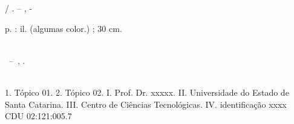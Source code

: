 \imprimircapa

\imprimirfolhaderosto*

%     

\begin{fichacatalografica}
	\vspace*{\fill}					%
	\begin{center}					%
	\begin{minipage}[c]{12.5cm}		%
	
	\imprimirautor
	
	\hspace{0.5cm} \imprimirtitulo  / \imprimirautor. --
	\imprimirlocal, \imprimirdata-
	
	\hspace{0.5cm} \pageref{LastPage} p. : il. (algumas color.) ; 30 cm.\\
	
	\hspace{0.5cm} \imprimirorientadorRotulo~\imprimirorientador\\
	
	\hspace{0.5cm}
	\parbox[t]{\textwidth}{\imprimirtipotrabalho~--~\imprimirinstituicao,
	\imprimirdata.}\\
	
	\hspace{0.5cm}
		1. Tópico 01.
		2. Tópico 02.
		I. Prof. Dr. xxxxx.
		II. Universidade do Estado de Santa Catarina.
		III. Centro de Ciências Tecnológicas.
		IV. identificação xxxx\\ 			
	
	\hspace{8.75cm} CDU 02:121:005.7\\
	
	\end{minipage}
	\end{center}
\end{fichacatalografica}

